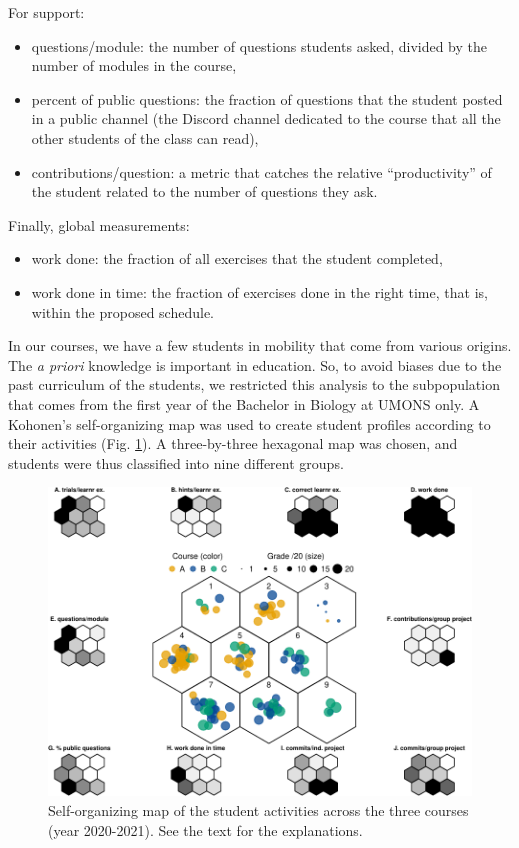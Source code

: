 \documentclass{aims}
\theoremstyle{definition}
\begin{document}
For support:

\begin{itemize}
\item
  questions/module: the number of questions students asked, divided by
  the number of modules in the course,
\item
  percent of public questions: the fraction of questions that the
  student posted in a public channel (the Discord channel dedicated to
  the course that all the other students of the class can read),
\item
  contributions/question: a metric that catches the relative
  ``productivity'' of the student related to the number of questions
  they ask.
\end{itemize}

Finally, global measurements:

\begin{itemize}
\item
  work done: the fraction of all exercises that the student completed,
\item
  work done in time: the fraction of exercises done in the right time,
  that is, within the proposed schedule.
\end{itemize}

In our courses, we have a few students in mobility that come from
various origins. The \emph{a priori} knowledge is important in
education. So, to avoid biases due to the past curriculum of the
students, we restricted this analysis to the subpopulation that comes
from the first year of the Bachelor in Biology at UMONS only. A
Kohonen's self-organizing map was used to create student profiles
according to their activities (Fig. \ref {fig:fig_som}). A
three-by-three hexagonal map was chosen, and students were thus
classified into nine different groups.

\begin{figure}
\includegraphics[width=1\linewidth]{teaching_data_science_files/figure-latex/fig_som-1} \caption{\label{fig:fig_som} Self-organizing map of the student activities across the three courses (year 2020-2021). See the text for the explanations.}\label{fig:fig_som}
\end{figure}
\end{document}
